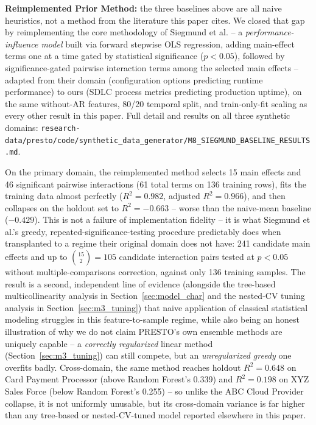 \documentclass[technologies,article,submit,pdftex,moreauthors]{Definitions/mdpi}
\begin{document}
\textbf{Reimplemented Prior Method:} the three baselines above are
all naive heuristics, not a method from the literature this paper cites.
We closed that gap by reimplementing the core methodology of Siegmund et
al. \cite{siegmund2015} -- a \emph{performance-influence model} built
via forward stepwise OLS regression, adding main-effect terms one at a
time gated by statistical significance (\(p<0.05\)), followed by
significance-gated pairwise interaction terms among the selected main
effects -- adapted from their domain (configuration options predicting
runtime performance) to ours (SDLC process metrics predicting production
uptime), on the same without-AR features, 80/20 temporal split, and
train-only-fit scaling as every other result in this paper. Full detail
and results on all three synthetic domains:
\texttt{research-data/\allowbreak presto/\allowbreak code/\allowbreak synthetic\_\allowbreak data\_\allowbreak generator/\allowbreak M8\_\allowbreak SIEGMUND\_\allowbreak BASELINE\_\allowbreak RESULTS.md}.

On the primary domain, the reimplemented method selects 15 main effects
and 46 significant pairwise interactions (61 total terms on 136 training
rows), fits the training data almost perfectly (\(R^2=0.982\), adjusted
\(R^2=0.966\)), and then collapses on the holdout set to \(R^2=-0.663\)
-- worse than the naive-mean baseline (\(-0.429\)). This is not a
failure of implementation fidelity -- it is what Siegmund et al.'s
greedy, repeated-significance-testing procedure predictably does when
transplanted to a regime their original domain does not have: 241
candidate main effects and up to \(\binom{15}{2}=105\) candidate
interaction pairs tested at \(p<0.05\) without multiple-comparisons
correction, against only 136 training samples. The result is a second,
independent line of evidence (alongside the tree-based multicollinearity
analysis in Section~\ref{sec:model_char} and the nested-CV tuning analysis in Section~\ref{sec:m3_tuning}) that naive application of classical statistical modeling
struggles in this feature-to-sample regime, while also being an honest
illustration of why we do not claim PRESTO's own ensemble methods are
uniquely capable -- a \emph{correctly regularized} linear method
(Section~\ref{sec:m3_tuning}) can still compete, but an \emph{unregularized greedy}
one overfits badly. Cross-domain, the same method reaches holdout
\(R^2=0.648\) on Card Payment Processor (above Random Forest's 0.339)
and \(R^2=0.198\) on XYZ Sales Force (below Random Forest's 0.255) -- so
unlike the ABC Cloud Provider collapse, it is not uniformly unusable,
but its cross-domain variance is far higher than any tree-based or
nested-CV-tuned model reported elsewhere in this paper.
\end{document}
